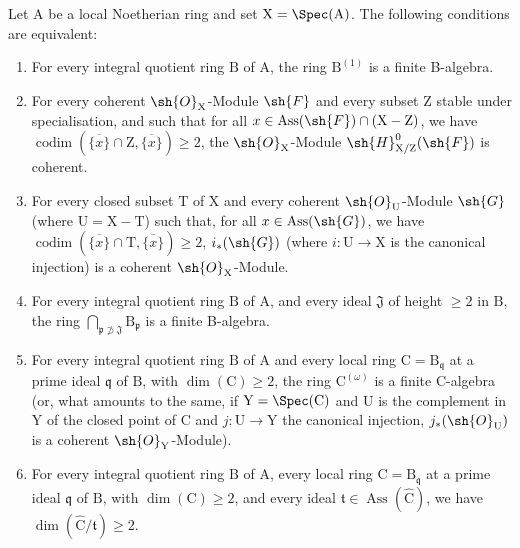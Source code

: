 \begin{proposition}[7.2.4]
\label{IV.7.2.4}
Let $\mathrm{A}$ be a local Noetherian ring and set $\mathrm{X}=\Spec(\mathrm{A})$.
The following conditions are equivalent:
\begin{enumerate}[label=\emph{\alph*)}]
  \item For every integral quotient ring $\mathrm{B}$ of $\mathrm{A}$, the ring $\mathrm{B}^{(1)}$ is a finite B-algebra.
  \item For every coherent $\sh{O}_\mathrm{X}$-Module $\sh{F}$ and every subset $\mathrm{Z}$ stable under specialisation, and such that for all $x\in\operatorname{Ass}(\sh{F})\cap(\mathrm{X}-\mathrm{Z})$, we have $\operatorname{codim}(\overline{\{x\}}\cap\mathrm{Z},\overline{\{x\}})\geqslant 2$, the $\sh{O}_\mathrm{X}$-Module $\sh{H}^0_{\mathrm{X}/\mathrm{Z}}(\sh{F})$ is coherent.
  \item For every closed subset $\mathrm{T}$ of $\mathrm{X}$ and every coherent $\sh{O}_\mathrm{U}$-Module $\sh{G}$ (where $\mathrm{U}=\mathrm{X}-\mathrm{T}$) such that, for all $x\in\operatorname{Ass}(\sh{G})$, we have $\operatorname{codim}(\overline{\{x\}}\cap\mathrm{T},\overline{\{x\}})\geqslant 2$, $i_*(\sh{G})$ (where $i:\mathrm{U}\to\mathrm{X}$ is the canonical injection) is a coherent $\sh{O}_\mathrm{X}$-Module.
  \item For every integral quotient ring $\mathrm{B}$ of $\mathrm{A}$, and every ideal $\mathfrak{J}$ of height $\geqslant 2$ in $\mathrm{B}$, the ring $\bigcap_{\mathfrak{p}\not\supset\mathfrak{J}}\mathrm{B}_\mathfrak{p}$ is a finite B-algebra.
  \item For every integral quotient ring $\mathrm{B}$ of $\mathrm{A}$ and every local ring $\mathrm{C}=\mathrm{B}_\mathfrak{q}$ at a prime ideal $\mathfrak{q}$ of $\mathrm{B}$, with $\dim(\mathrm{C})\geqslant 2$, the ring $\mathrm{C}^{(\omega)}$ is a finite C-algebra (or, what amounts to the same, if $\mathrm{Y}=\Spec(\mathrm{C})$ and $\mathrm{U}$ is the complement in $\mathrm{Y}$ of the closed point of $\mathrm{C}$ and $j:\mathrm{U}\to\mathrm{Y}$ the canonical injection, $j_*(\sh{O}_\mathrm{U})$ is a coherent $\sh{O}_\mathrm{Y}$-Module).
  \item For every integral quotient ring $\mathrm{B}$ of $\mathrm{A}$, every local ring $\mathrm{C}=\mathrm{B}_\mathfrak{q}$ at a prime ideal $\mathfrak{q}$ of $\mathrm{B}$, with $\dim(\mathrm{C})\geqslant 2$, and every ideal $\mathfrak{t}\in\operatorname{Ass}(\widehat{\mathrm{C}})$, we have $\dim(\widehat{\mathrm{C}}/\mathfrak{t})\geqslant 2$.
\end{enumerate}
\end{proposition}

